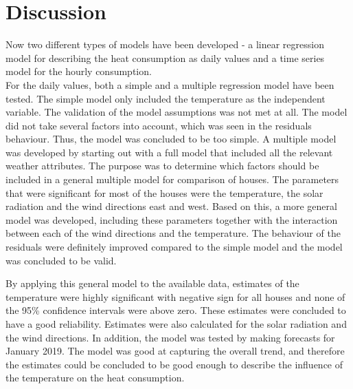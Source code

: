 \chapter{Discussion}
\label{chap: discussion}
Now two different types of models have been developed - a linear regression model for describing the heat consumption as daily values and a time series model for the hourly consumption. \\

\noindent For the daily values, both a simple and a multiple regression model have been tested. The simple model only included the temperature as the independent variable. The validation of the model assumptions was not met at all. The model did not take several factors into account, which was seen in the residuals behaviour. Thus, the model was concluded to be too simple. A multiple model was developed by starting out with a full model that included all the relevant weather attributes. The purpose was to determine which factors should be included in a general multiple model for comparison of houses. The parameters that were significant for most of the houses were the temperature, the solar radiation and the wind directions east and west. Based on this, a more general model was developed, including these parameters together with the interaction between each of the wind directions and the temperature. The behaviour of the residuals were definitely improved compared to the simple model and the model was concluded to be valid.

\noindent By applying this general model to the available data, estimates of the temperature were highly significant with negative sign for all houses and none of the 95\% confidence intervals were above zero. These estimates were concluded to have a good reliability. Estimates were also calculated for the solar radiation and the wind directions. In addition, the model was tested by making forecasts for January 2019. The model was good at capturing the overall trend, and therefore the estimates could be concluded to be good enough to describe the influence of the temperature on the heat consumption. \\

